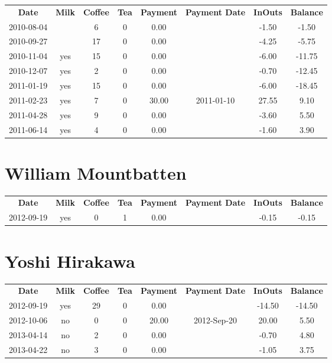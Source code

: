 \begin{center}
\begin{tabular}{cccccccc}
\textbf{Date} & \textbf{Milk} & \textbf{Coffee} & \textbf{Tea} & \textbf{Payment} & \textbf{Payment Date} & \textbf{InOuts} & \textbf{Balance} \\
2010-08-04 &  &  6 & 0 &  0.00 &  & -1.50 &  -1.50\\ 
2010-09-27 &  & 17 & 0 &  0.00 &  & -4.25 &  -5.75\\ 
2010-11-04 & yes & 15 & 0 &  0.00 &  & -6.00 & -11.75\\ 
2010-12-07 & yes &  2 & 0 &  0.00 &  & -0.70 & -12.45\\ 
2011-01-19 & yes & 15 & 0 &  0.00 &  & -6.00 & -18.45\\ 
2011-02-23 & yes &  7 & 0 & 30.00 & 2011-01-10 & 27.55 &   9.10\\ 
2011-04-28 & yes &  9 & 0 &  0.00 &  & -3.60 &   5.50\\ 
2011-06-14 & yes &  4 & 0 &  0.00 &  & -1.60 &   3.90
\end{tabular}
\end{center}

\section{William Mountbatten}

\begin{center}
\begin{tabular}{cccccccc}
\textbf{Date} & \textbf{Milk} & \textbf{Coffee} & \textbf{Tea} & \textbf{Payment} & \textbf{Payment Date} & \textbf{InOuts} & \textbf{Balance} \\
2012-09-19 & yes & 0 & 1 & 0.00 &  & -0.15 & -0.15
\end{tabular}
\end{center}

\section{Yoshi Hirakawa}

\begin{center}
\begin{tabular}{cccccccc}
\textbf{Date} & \textbf{Milk} & \textbf{Coffee} & \textbf{Tea} & \textbf{Payment} & \textbf{Payment Date} & \textbf{InOuts} & \textbf{Balance} \\
2012-09-19 & yes & 29 & 0 &  0.00 &  & -14.50 & -14.50\\ 
2012-10-06 & no &  0 & 0 & 20.00 & 2012-Sep-20 &  20.00 &   5.50\\ 
2013-04-14 & no &  2 & 0 &  0.00 &  &  -0.70 &   4.80\\ 
2013-04-22 & no &  3 & 0 &  0.00 &  &  -1.05 &   3.75
\end{tabular}
\end{center}

